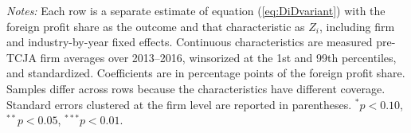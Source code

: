 \documentclass[11pt,letterpaper]{article}
\begin{document}
\begin{table}[!tp]
\begin{threeparttable}
\bigskip
\begin{tablenotes}[flushleft]
\item[] \footnotesize{\textit{Notes:} Each row is a separate estimate of
equation (\ref{eq:DiDvariant}) with the foreign profit share as the outcome and
that characteristic as $Z_i$, including firm and industry-by-year fixed
effects. Continuous characteristics are measured pre-TCJA firm averages over 2013--2016, winsorized
at the 1st and 99th percentiles, and standardized. Coefficients are in
percentage points of the foreign profit share. Samples differ across rows
because the characteristics have different coverage. Standard errors clustered
at the firm level are reported in parentheses. $^{*} p<0.10$,
$^{**} p<0.05$, $^{***} p<0.01$.}
\end{tablenotes}
\end{threeparttable}

\bigskip
\bigskip
\end{table}
\end{document}
